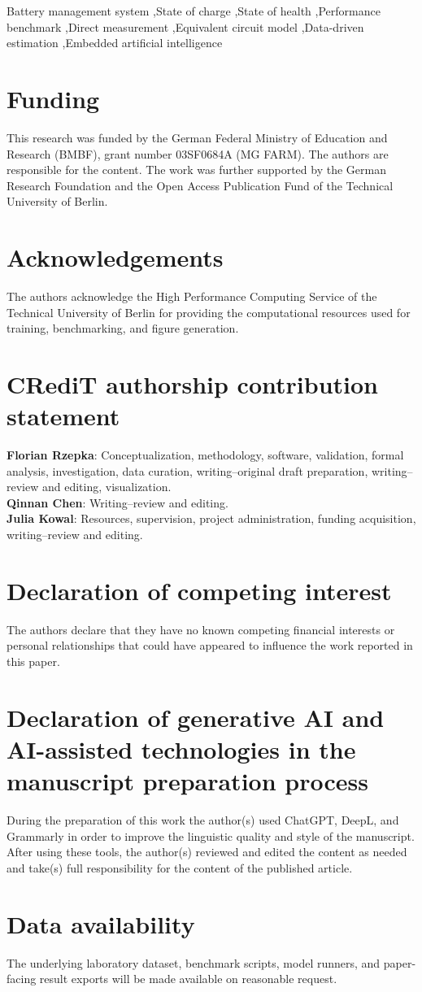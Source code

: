 \documentclass[review,nopreprintline]{elsarticle}
\begin{document}
\begin{frontmatter}
\begin{keyword}
Battery management system \sep State of charge \sep State of health \sep Performance benchmark \sep Direct measurement \sep Equivalent circuit model \sep Data-driven estimation \sep Embedded artificial intelligence
\end{keyword}

\end{frontmatter}

\section*{Funding}
This research was funded by the German Federal Ministry of Education and Research (BMBF), grant number 03SF0684A (MG FARM). The authors are responsible for the content. The work was further supported by the German Research Foundation and the Open Access Publication Fund of the Technical University of Berlin.

\section*{Acknowledgements}
The authors acknowledge the High Performance Computing Service of the Technical University of Berlin for providing the computational resources used for training, benchmarking, and figure generation.

\section*{CRediT authorship contribution statement}
\textbf{Florian Rzepka}: Conceptualization, methodology, software, validation, formal analysis, investigation, data curation, writing--original draft preparation, writing--review and editing, visualization.\\
\textbf{Qinnan Chen}: Writing--review and editing.\\
\textbf{Julia Kowal}: Resources, supervision, project administration, funding acquisition, writing--review and editing.

\section*{Declaration of competing interest}
The authors declare that they have no known competing financial interests or personal relationships that could have appeared to influence the work reported in this paper.

\section*{Declaration of generative AI and AI-assisted technologies in the manuscript preparation process}
During the preparation of this work the author(s) used ChatGPT, DeepL, and Grammarly in order to improve the linguistic quality and style of the manuscript. After using these tools, the author(s) reviewed and edited the content as needed and take(s) full responsibility for the content of the published article.

\section*{Data availability}
The underlying laboratory dataset, benchmark scripts, model runners, and paper-facing result exports will be made available on reasonable request.
\end{document}
